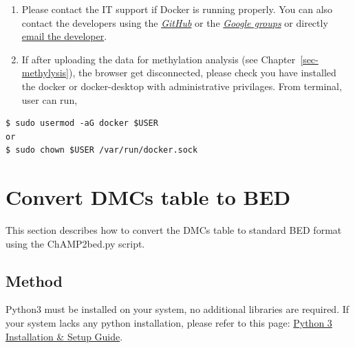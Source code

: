 \documentclass[
  a4paper,
  DIV=11,
  numbers=noendperiod,
  oneside,
  open=any]{scrreport}
\providecommand{\tightlist}{%
  \setlength{\itemsep}{0pt}\setlength{\parskip}{0pt}}\usepackage{longtable,booktabs,array}
\begin{document}
\begin{tcolorbox}[enhanced jigsaw, breakable, colback=white, colbacktitle=quarto-callout-note-color!10!white, opacityback=0, left=2mm, bottomrule=.15mm, opacitybacktitle=0.6, coltitle=black, bottomtitle=1mm, toprule=.15mm, toptitle=1mm, arc=.35mm, titlerule=0mm, rightrule=.15mm, title=\textcolor{quarto-callout-note-color}{\faInfo}\hspace{0.5em}{Note}, colframe=quarto-callout-note-color-frame, leftrule=.75mm]

\begin{enumerate}
\def\labelenumi{\arabic{enumi}.}
\tightlist
\item
  Please contact the IT support if Docker is running properly. You can
  also contact the developers using the
  \href{https://github.com/JD2112/methylr/issues}{\emph{GitHub}} or the
  \href{https://groups.google.com/g/methylr}{\emph{Google groups}} or
  directly \href{mailto:methylr@googlegroups.com}{email the developer}.
\item
  If after uploading the data for methylation analysis (see
  Chapter~\ref{sec-methylysis}), the browser get disconnected, please
  check you have installed the docker or docker-desktop with
  administrative privilages. From terminal, user can run,
\end{enumerate}

\begin{verbatim}
$ sudo usermod -aG docker $USER
or
$ sudo chown $USER /var/run/docker.sock
\end{verbatim}

\end{tcolorbox}

\chapter{Convert DMCs table to BED}\label{sec-bed}

This section describes how to convert the DMCs table to standard BED
format using the ChAMP2bed.py script.

\section{Method}\label{method}

Python3 must be installed on your system, no additional libraries are
required. If your system lacks any python installation, please refer to
this page: \href{https://realpython.com/installing-python/}{Python 3
Installation \& Setup Guide}.
\end{document}
